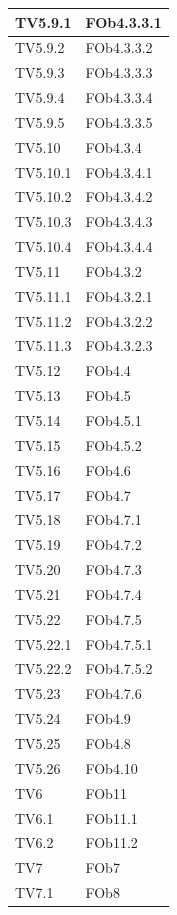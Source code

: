 \begin{longtable}{|p{5cm}|p{5cm}|}
	\hline
	TV5.9.1 & FOb4.3.3.1\\
	\hline
	TV5.9.2 & FOb4.3.3.2\\
	\hline
	TV5.9.3 & FOb4.3.3.3\\
	\hline
	TV5.9.4 & FOb4.3.3.4\\
	\hline
	TV5.9.5 & FOb4.3.3.5\\
	\hline
	TV5.10 & FOb4.3.4\\ %
	\hline
	TV5.10.1 & FOb4.3.4.1\\
	\hline
	TV5.10.2 & FOb4.3.4.2\\
	\hline
	TV5.10.3 & FOb4.3.4.3\\
	\hline
	TV5.10.4 & FOb4.3.4.4\\
	\hline
	TV5.11 & FOb4.3.2\\ %
	\hline
	TV5.11.1 & FOb4.3.2.1\\
	\hline
	TV5.11.2 & FOb4.3.2.2\\
	\hline
	TV5.11.3 & FOb4.3.2.3\\
	\hline
	TV5.12 & FOb4.4\\ %
	\hline
	TV5.13 & FOb4.5\\ %
	\hline
	TV5.14 & FOb4.5.1\\ %
	\hline
	TV5.15 & FOb4.5.2\\ %
	\hline
	TV5.16 & FOb4.6\\ %
	\hline
	TV5.17 & FOb4.7\\ %
	\hline
	TV5.18 & FOb4.7.1\\ %
	\hline
	TV5.19 & FOb4.7.2\\ %
	\hline
	TV5.20 & FOb4.7.3\\ %
	\hline
	TV5.21 & FOb4.7.4\\ %
	\hline
	TV5.22 & FOb4.7.5\\ %
	\hline
	TV5.22.1 & FOb4.7.5.1\\ %
	\hline
	TV5.22.2 & FOb4.7.5.2\\ %
	\hline 
	TV5.23 & FOb4.7.6\\ %
	\hline 
	TV5.24 & FOb4.9\\ %
	\hline
	TV5.25 & FOb4.8\\ %
	\hline
	TV5.26 & FOb4.10\\%
	\hline
	TV6 & FOb11\\
	\hline
	TV6.1 & FOb11.1\\
	\hline
	TV6.2 & FOb11.2 \\	
	\hline
	TV7 & FOb7\\
	\hline
	TV7.1& FOb8\\
\hline
\end{longtable}









